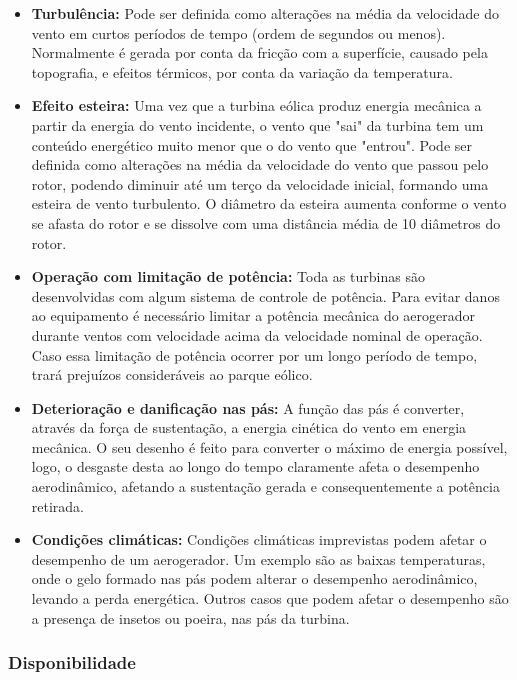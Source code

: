 \begin{itemize}
  \item \textbf{Turbulência:} Pode ser definida como alterações na média da velocidade do vento em curtos períodos de tempo (ordem de segundos ou menos). Normalmente é gerada por conta da fricção com a superfície, causado pela topografia, e efeitos térmicos, por conta da variação da temperatura.
  \item \textbf{Efeito esteira:} Uma vez que a turbina eólica produz energia mecânica a partir da energia do vento incidente, o vento que "sai" da turbina tem um conteúdo energético muito menor que o do vento que "entrou". Pode ser definida como alterações na média da velocidade do vento que passou pelo rotor, podendo diminuir até um terço da velocidade inicial, formando uma esteira de vento turbulento. O diâmetro da esteira aumenta conforme o vento se afasta do rotor e se dissolve com uma distância média de 10 diâmetros do rotor.
  \item \textbf{Operação com limitação de potência:} Toda as turbinas são desenvolvidas com algum sistema de controle de potência. Para evitar danos ao equipamento é necessário limitar a potência mecânica do aerogerador durante ventos com velocidade acima da velocidade nominal de operação. Caso essa limitação de potência ocorrer por um longo período de tempo, trará prejuízos consideráveis ao parque eólico.
  \item \textbf{Deterioração e danificação nas pás:} A função das pás é converter, através da força de sustentação, a energia cinética do vento em energia mecânica. O seu desenho é feito para converter o máximo de energia possível, logo, o desgaste desta ao longo do tempo claramente afeta o desempenho aerodinâmico, afetando a sustentação gerada e consequentemente a potência retirada.
  \item \textbf{Condições climáticas:} Condições climáticas imprevistas podem afetar o desempenho de um aerogerador. Um exemplo são as baixas temperaturas, onde o gelo formado nas pás podem alterar o desempenho aerodinâmico, levando a perda energética. Outros casos que podem afetar o desempenho são a presença de insetos ou poeira, nas pás da turbina.
\end{itemize}

\subsubsection{Disponibilidade}
\label{Sec:disponibilidadeDesempenhoAerogeradores}



